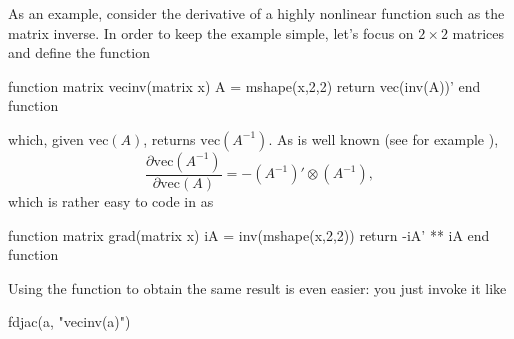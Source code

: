 As an example, consider the derivative of a highly nonlinear function
such as the matrix inverse. In order to keep the example simple, let's
focus on $2 \times 2$ matrices and define the function
\begin{code}
function matrix vecinv(matrix x)
    A = mshape(x,2,2)
    return vec(inv(A))'
end function
\end{code}
which, given $\mathrm{vec}(A)$, returns $\mathrm{vec}(A^{-1})$. As is
well known (see for example \cite{magneu88}),
\[
  \frac{\partial \mathrm{vec}(A^{-1})}{\partial \mathrm{vec}(A)} 
  = - (A^{-1})' \otimes (A^{-1}),
\]
which is rather easy to code in  as
\begin{code}
function matrix grad(matrix x)
    iA = inv(mshape(x,2,2))
    return -iA' ** iA
end function  
\end{code}
Using the  function to obtain the same result is even
easier: you just invoke it like
\begin{code}
fdjac(a, "vecinv(a)")  
\end{code}

